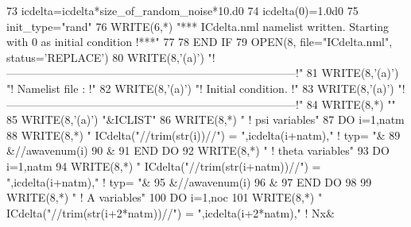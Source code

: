 \begin{DoxyCode}
73        icdelta=icdelta*size\_of\_random\_noise*10.d0
74        icdelta(0)=1.0d0
75        init\_type=\textcolor{stringliteral}{"rand"}
76        \textcolor{keyword}{WRITE}(6,*) \textcolor{stringliteral}{"*** ICdelta.nml namelist written. Starting with 0 as initial condition !***"}
77 
78 \textcolor{keywordflow}{    END IF}
79     \textcolor{keyword}{OPEN}(8, file=\textcolor{stringliteral}{"ICdelta.nml"}, status=\textcolor{stringliteral}{'REPLACE'})
80     \textcolor{keyword}{WRITE}(8,\textcolor{stringliteral}{'(a)'}) \textcolor{stringliteral}{"!------------------------------------------------------------------------------!"}
81     \textcolor{keyword}{WRITE}(8,\textcolor{stringliteral}{'(a)'}) \textcolor{stringliteral}{"! Namelist file :                                                              !"}
82     \textcolor{keyword}{WRITE}(8,\textcolor{stringliteral}{'(a)'}) \textcolor{stringliteral}{"! Initial condition.                                                           !"}
83     \textcolor{keyword}{WRITE}(8,\textcolor{stringliteral}{'(a)'}) \textcolor{stringliteral}{"!------------------------------------------------------------------------------!"}
84     \textcolor{keyword}{WRITE}(8,*) \textcolor{stringliteral}{""}
85     \textcolor{keyword}{WRITE}(8,\textcolor{stringliteral}{'(a)'}) \textcolor{stringliteral}{"&ICLIST"}
86     \textcolor{keyword}{WRITE}(8,*) \textcolor{stringliteral}{" ! psi variables"}
87     \textcolor{keywordflow}{DO} i=1,natm
88        \textcolor{keyword}{WRITE}(8,*) \textcolor{stringliteral}{" ICdelta("}//trim(str(i))//\textcolor{stringliteral}{") = "},icdelta(i+natm),\textcolor{stringliteral}{"   ! typ= "}&
89             &//awavenum(i)%
90             &%
91 \textcolor{keywordflow}{    END DO}
92     \textcolor{keyword}{WRITE}(8,*) \textcolor{stringliteral}{" ! theta variables"}
93     \textcolor{keywordflow}{DO} i=1,natm
94        \textcolor{keyword}{WRITE}(8,*) \textcolor{stringliteral}{" ICdelta("}//trim(str(i+natm))//\textcolor{stringliteral}{") = "},icdelta(i+natm),\textcolor{stringliteral}{"   ! typ= "}&
95             &//awavenum(i)%
96             &%
97 \textcolor{keywordflow}{    END DO}
98 
99     \textcolor{keyword}{WRITE}(8,*) \textcolor{stringliteral}{" ! A variables"}
100     \textcolor{keywordflow}{DO} i=1,noc
101        \textcolor{keyword}{WRITE}(8,*) \textcolor{stringliteral}{" ICdelta("}//trim(str(i+2*natm))//\textcolor{stringliteral}{") = "},icdelta(i+2*natm),\textcolor{stringliteral}{"   ! Nx&}

\end{DoxyCode}
